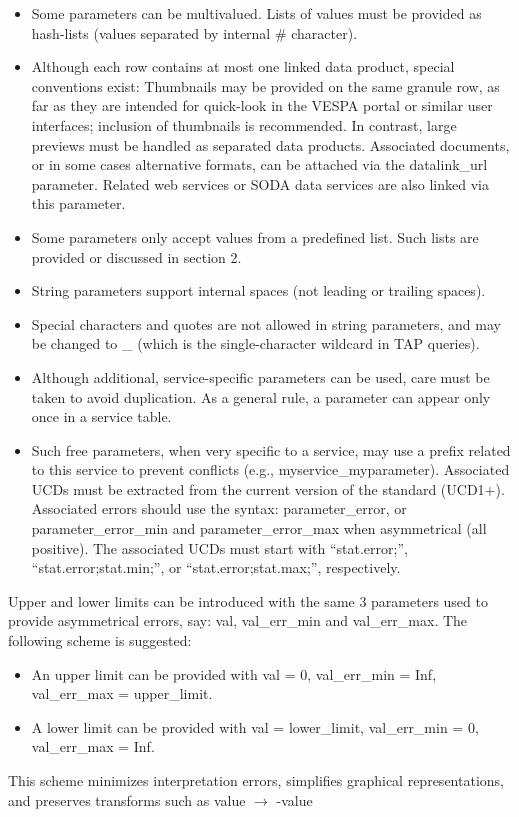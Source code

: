 \documentclass[11pt,a4paper]{ivoa}
\begin{document}
\begin{itemize}
\begin{itemize}
\item Some parameters can be multivalued. Lists of values must be provided as hash-lists (values separated by internal \# character).

\item Although each row contains at most one linked data product, special conventions exist: 
Thumbnails may be provided on the same granule row, as far as they are intended for quick-look in the VESPA portal or similar user interfaces; inclusion of thumbnails is recommended. In contrast, large previews must be handled as separated data products.
Associated documents, or in some cases alternative formats, can be attached via the datalink\_url parameter. Related web services or SODA data services are also linked via this parameter.

\item Some parameters only accept values from a predefined list. Such lists are provided or discussed in section 2.

\item String parameters support internal spaces (not leading or trailing spaces).

\item Special characters and quotes are not allowed in string parameters, and may be changed to \_ (which is the single-character wildcard in TAP queries). 

\item Although additional, service-specific parameters can be used, care must be taken to avoid duplication. As a general rule, a parameter can appear only once in a service table.

\item Such free parameters, when very specific to a service, may use a prefix related to this service to prevent conflicts (e.g., myservice\_myparameter). Associated UCDs must be extracted from the current version of the standard (UCD1+).
Associated errors should use the syntax: parameter\_error, or parameter\_error\_min and parameter\_error\_max when asymmetrical (all positive). The associated UCDs must start with ``stat.error;'', ``stat.error;stat.min;'', or ``stat.error;stat.max;'', respectively.
\end{itemize}

Upper and lower limits can be introduced with the same 3 parameters used to provide asymmetrical errors, say: val, val\_err\_min and val\_err\_max. The following scheme is suggested: 

\begin{itemize}
\item An upper limit can be provided with val = 0, val\_err\_min = Inf, val\_err\_max = upper\_limit.

\item A lower limit can be provided with val = lower\_limit, val\_err\_min = 0, val\_err\_max = Inf.
\end{itemize}

This scheme minimizes interpretation errors, simplifies graphical representations, and preserves transforms such as value $\to$ -value


\end{itemize}
\end{document}
